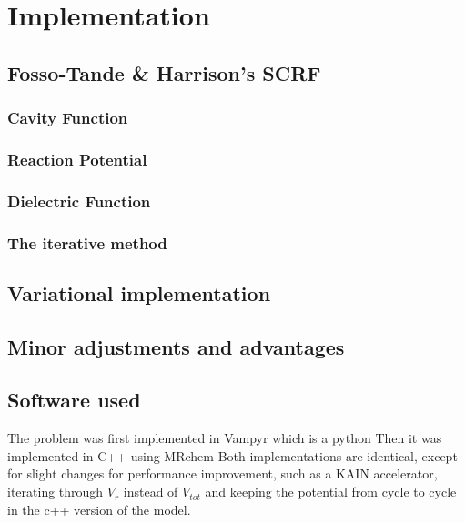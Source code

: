 \documentclass[../master_thesis.tex]{subfiles}
\begin{document}
\chapter{Implementation}\label{chap:implementation}
\section{Fosso-Tande \& Harrison's \ac{SCRF}}
\subsection{Cavity Function}
\subsection{Reaction Potential}
\subsection{Dielectric Function}
\subsection{The iterative method}
\section{Variational implementation}
\section{Minor adjustments and advantages}

\section{Software used}
The problem was first implemented in Vampyr %
which is a python %
Then it was implemented in C++ using MRchem %
Both implementations are identical, except for slight changes for
performance improvement, such as a KAIN accelerator, %
iterating through $V_r$ instead of $V_{tot}$ %
and keeping the potential from cycle to cycle
in the c++ version of the model.



\biblio
\end{document}
